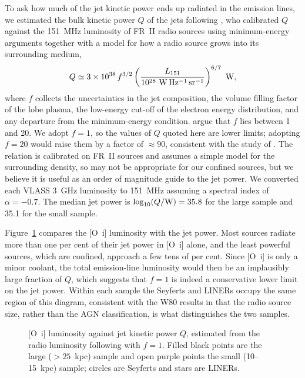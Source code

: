 \documentclass[linenumbers,trackchanges]{aastex701}
\begin{document}
To ask how much of the jet kinetic power ends up radiated in the emission lines, we estimated the bulk kinetic power $Q$ of the jets following \citet{willott1999}, who calibrated $Q$ against the 151~MHz luminosity of FR~II radio sources using minimum-energy arguments together with a model for how a radio source grows into its surrounding medium,
\begin{equation}
Q \simeq 3\times10^{38} \, f^{3/2}
\left(\frac{L_{151}}{10^{28}~{\rm W\,Hz^{-1}\,sr^{-1}}}\right)^{6/7}~{\rm W},
\end{equation}
where $f$ collects the uncertainties in the jet composition, the volume filling factor of the lobe plasma, the low-energy cut-off of the electron energy distribution, and any departure from the minimum-energy condition. \citet{willott1999} argue that $f$ lies between 1 and 20. We adopt $f=1$, so the values of $Q$ quoted here are lower limits; adopting $f=20$ would raise them by a factor of $\approx 90$, consistent with the study of \citet{cavagnolo10}. The relation is calibrated on FR~II sources and assumes a simple model for the surrounding density, so may not be appropriate for our confined sources, but we believe it is useful as an order of magnitude guide to the jet power. We converted each VLASS 3~GHz luminosity to 151~MHz assuming a spectral index of $\alpha = -0.7$.
The median jet power is $\log_{10}(Q/{\rm W}) = 35.8$ for the large sample and 35.1 for the small sample.

Figure~\ref{fig:loiq} compares the [O~{\sc i}] luminosity with the jet power. Most sources radiate more than one per cent of their jet power in [O~{\sc i}] alone, and the least powerful sources, which are confined, approach a few tens of per cent. Since [O~{\sc i}] is only a minor coolant, the total emission-line luminosity would then be an implausibly large fraction of $Q$, which suggests that $f=1$ is indeed a conservative lower limit on the jet power. Within each sample the Seyferts and LINERs occupy the same region of this diagram, consistent with the W80 results in that the radio source size, rather than the AGN classification, is what distinguishes the two samples.

\begin{figure}
\caption{[O~{\sc i}] luminosity against jet kinetic power $Q$, estimated from the radio luminosity following \citet{willott1999} with $f=1$. Filled black points are the large ($>25$~kpc) sample and open purple points the small (10--15~kpc) sample; circles are Seyferts and stars are LINERs.}
\label{fig:loiq}
\end{figure}
\end{document}
